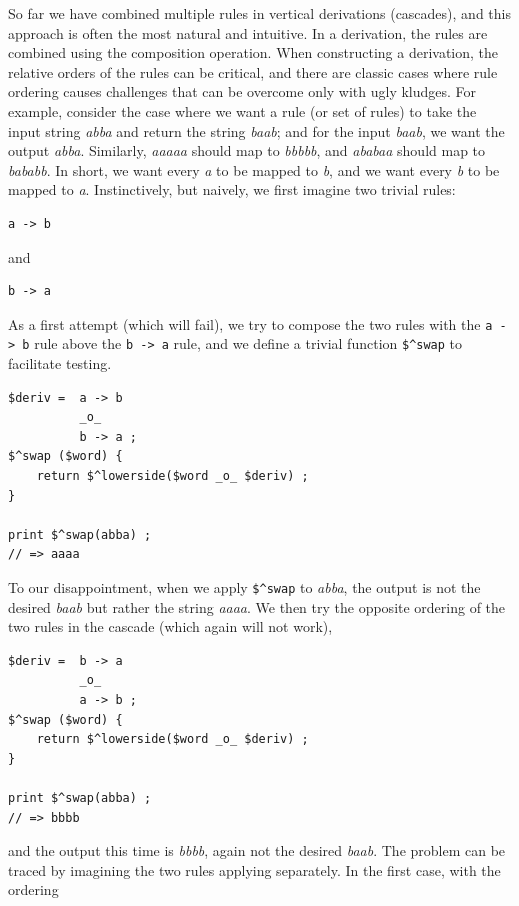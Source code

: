 So far we have combined multiple rules in vertical derivations (cascades), and this
approach is often the most natural and intuitive.  In a derivation, the rules are combined
using the composition operation.  When constructing a derivation, the relative orders of the
rules can be critical, and there are classic cases where rule ordering causes challenges
that can be overcome only with ugly kludges.  For example, consider the case where we want
a rule (or set of rules) to take the input string \emph{abba} and return the string
\emph{baab}; and for the input \emph{baab}, we want the output \emph{abba}.  Similarly,
\emph{aaaaa} should map to \emph{bbbbb}, and \emph{ababaa} should map to \emph{bababb}.  In
short, we want every \emph{a} to be mapped to \emph{b}, and we want every \emph{b} to be
mapped to \emph{a}.  Instinctively, but naively, we first imagine two trivial rules:


\begin{Verbatim}
a -> b 
\end{Verbatim}

\noindent
and

\begin{Verbatim}
b -> a
\end{Verbatim}

As a first attempt (which will fail), we try to compose the two rules with the \verb!a -> b! rule above the
\verb!b -> a! rule, and we define a trivial function \verb!$^swap! to facilitate testing.


\begin{Verbatim}
$deriv =  a -> b
          _o_
          b -> a ;
$^swap ($word) { 
    return $^lowerside($word _o_ $deriv) ;
}

print $^swap(abba) ;
// => aaaa
\end{Verbatim}

\noindent
To our disappointment, when we apply \verb!$^swap! to \emph{abba}, the output is not the desired
\emph{baab} but rather the string \emph{aaaa}.  We then try the opposite ordering of the
two rules in the cascade (which again will not work),

\begin{Verbatim}
$deriv =  b -> a
          _o_
          a -> b ;
$^swap ($word) { 
    return $^lowerside($word _o_ $deriv) ;
}

print $^swap(abba) ;
// => bbbb
\end{Verbatim}

\noindent
and the output this time is \emph{bbbb}, again not the desired \emph{baab}.  The problem
can be traced by imagining the two rules applying separately.  In the first case, with the
ordering


